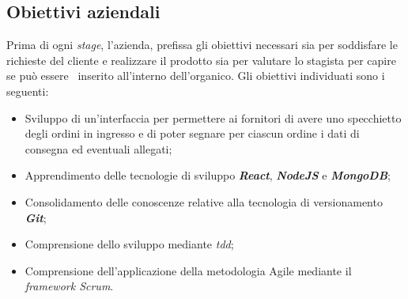 \subsection{Obiettivi aziendali}
Prima di ogni \emph{stage}, l'azienda, prefissa gli obiettivi necessari sia per soddisfare le richieste del cliente e realizzare il prodotto sia per valutare lo stagista per capire se può essere \
inserito all'interno dell'organico. Gli obiettivi individuati sono i seguenti:
\begin{itemize}
  \item Sviluppo di un'interfaccia per permettere ai fornitori di avere uno specchietto degli ordini in ingresso e di poter segnare per ciascun ordine i dati di consegna ed eventuali allegati;
  \item Apprendimento delle tecnologie di sviluppo \emph{\textbf{React}}, \emph{\textbf{NodeJS}} e \emph{\textbf{MongoDB}};
  \item Consolidamento delle conoscenze relative alla tecnologia di versionamento \emph{\textbf{Git}};
  \item Comprensione dello sviluppo mediante \emph{\acrshort{tdd}};
  \item Comprensione dell'applicazione della metodologia Agile mediante il \emph{framework Scrum}.
\end{itemize}

